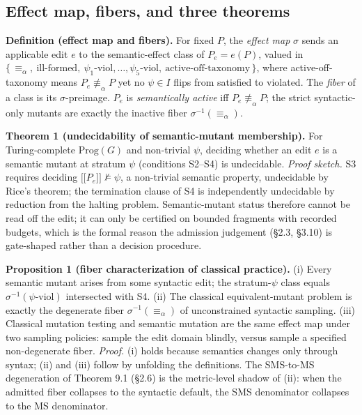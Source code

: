 \documentclass[acmsmall,screen,review]{acmart}
\providecommand{\llbracket}{\mathopen{\lbrack\!\lbrack}}
\providecommand{\rrbracket}{\mathclose{\rbrack\!\rbrack}}
\begin{document}
\subsection{Effect map, fibers, and three theorems}\label{theory-fibers}

\textbf{Definition (effect map and fibers).} For fixed $P$, the
\emph{effect map} $\sigma$ sends an applicable edit $e$ to the
semantic-effect class of $P_e = e(P)$, valued in
$\{\, \equiv_\alpha,\ \text{ill-formed},\ \psi_1\text{-viol}, \dots, \psi_5\text{-viol},\ \text{active-off-taxonomy} \,\}$,
where active-off-taxonomy means $P_e \not\equiv_\alpha P$ yet no
$\psi \in I$ flips from satisfied to violated. The \emph{fiber} of a
class is its $\sigma$-preimage. $P_e$ is \emph{semantically active} iff
$P_e \not\equiv_\alpha P$; the strict syntactic-only mutants are exactly
the inactive fiber $\sigma^{-1}(\equiv_\alpha)$.

\textbf{Theorem 1 (undecidability of semantic-mutant membership).} For
Turing-complete $\mathrm{Prog}(G)$ and non-trivial $\psi$, deciding
whether an edit $e$ is a semantic mutant at stratum $\psi$
(conditions S2--S4) is undecidable. \emph{Proof sketch.} S3 requires
deciding $\llbracket P_e \rrbracket \not\models \psi$, a non-trivial
semantic property, undecidable by Rice's theorem; the termination clause
of S4 is independently undecidable by reduction from the halting
problem. Semantic-mutant status therefore cannot be read off the edit;
it can only be certified on bounded fragments with recorded budgets,
which is the formal reason the admission judgement (§2.3, §3.10) is
gate-shaped rather than a decision procedure.

\textbf{Proposition 1 (fiber characterization of classical practice).}
(i) Every semantic mutant arises from some syntactic edit; the
stratum-$\psi$ class equals $\sigma^{-1}(\psi\text{-viol})$ intersected
with S4. (ii) The classical equivalent-mutant problem is exactly the
degenerate fiber $\sigma^{-1}(\equiv_\alpha)$ of unconstrained syntactic
sampling. (iii) Classical mutation testing and semantic mutation are the
same effect map under two sampling policies: sample the edit domain
blindly, versus sample a specified non-degenerate fiber. \emph{Proof.}
(i) holds because semantics changes only through syntax; (ii) and (iii)
follow by unfolding the definitions. The SMS-to-MS degeneration of
Theorem 9.1 (§2.6) is the metric-level shadow of (ii): when the admitted
fiber collapses to the syntactic default, the SMS denominator collapses
to the MS denominator.
\end{document}
